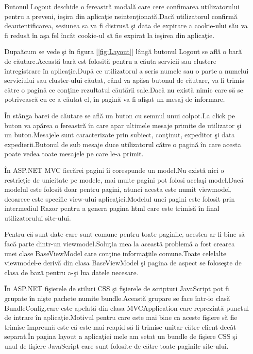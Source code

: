 \documentclass[a4paper,12pt]{report}
\let\oldref\ref
\renewcommand{\ref}[1]{[\oldref{#1}]}
\begin{document}
Butonul Logout deschide o fereastr\u a modal\u a care cere confimarea utilizatorului pentru a preveni,
ie\c sira din aplica\c tie neinten\c tionat\u a.Dac\u a utilizatorul confirm\u a deautentificarea,
sesiunea sa va fi distrus\u a \c si data de expirare a cookie-ului s\u au va fi redus\u a \^in a\c sa fel
\^inc\^at cookie-ul s\u a fie expirat la ie\c sirea din aplica\c tie.

Dupa\u acum se vede \c si \^in figura \ref{fig:Layout} l\^ang\u a butonul Logout se afl\u a o bar\u a de 
c\u autare.Aceast\u a bar\u a est folosit\u a pentru a c\u auta servicii sau clustere \^intregistrare \^in 
aplica\c tie.Dup\u a ce utilizatorul a scris numele sau o parte a numelui serviciului sau cluster-ului c\u autat,
c\^and va ap\u asa butonul de c\u autare, va fi trimis c\u atre o pagin\u a ce con\c tine rezultatul c\u aut\u arii
sale.Dac\u a nu exist\u a nimic care s\u a se potriveasc\u a cu ce a c\u autat el, \^in pagin\u a va fi afi\c sat un mesaj
de informare.

\^In st\^ anga barei de c\u autare se afl\u a un buton cu semnul unui colpot.La click pe buton va ap\u area
o fereastr\u a \^in care apar ultimele mesaje primite de utilizator \c si un buton.Mesajele sunt caracterizate 
prin subiect, con\c tinut, expeditor \c si data expedierii.Butonul de sub mesaje duce utilizatorul c\u atre o 
pagin\u a \^in care acesta poate vedea toate mesajele pe care le-a primit.

\^In ASP.NET MVC fiec\u arei pagini \^ii corespunde un model.Nu exist\u a nici o restric\c tie de unicitate
pe modele, mai multe pagini pot folosi acela\c si model.Dac\u a modelul este folosit doar pentru pagini,
atunci acesta este numit viewmodel, deoarece este specific view-ului aplica\c tiei.Modelul unei pagini 
este folosit prin intermediul Razor pentru a genera pagina html care este trimis\u a \^in final utilizatorului
site-ului.

Pentru c\u a sunt date care sunt comune pentru toate paginile, acestea ar fi bine s\u a fac\u a parte dintr-un
viewmodel.Solu\c tia mea la aceast\u a problem\u a a fost crearea unei clase BaseViewModel care con\c tine informa\c tiile 
comune.Toate celelalte viewmodel-e deriv\u a din clasa BaseViewModel \c si pagina de aspect se folose\c ste de clasa
de baz\u a pentru a-\c si lua datele necesare.

\^In ASP.NET fi\c sierele de stiluri CSS \c si fi\c sierele de scripturi JavaScript pot fi grupate \^in ni\c ste 
pachete numite bundle.Aceast\u a grupare se face \^intr-io clas\u a BundleConfig,care este apelat\u a din clasa 
MVCApplication care reprezint\u a punctul de intrare \^in aplica\c tie.Motivul pentru care este mai bine ca aceste fi\c siere s\u a fie trimise \^impreun\u a 
este c\u a este mai reapid s\u a fi trimise unitar c\u atre client dec\^at separat.\^In pagina layout a aplica\c tiei 
mele am setat un  bundle de fi\c siere CSS \c si unul de fi\c siere JavaScript care sunt folosite de c\u atre toate paginile
site-ului.
\end{document}

